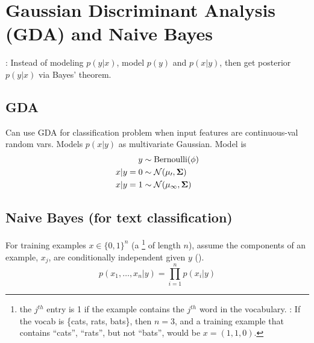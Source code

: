 \documentclass[11pt]{article}
\begin{document}



\section{Gaussian Discriminant Analysis (GDA) and Naive Bayes}
\label{sec:GDA_nbayes}
: Instead of modeling $p(y|x)$, model $p(y)$ and $p(x|y)$,
then get posterior $p(y|x)$ via Bayes' theorem.

\subsection{GDA}
Can use GDA for classification problem when input features are continuous-val random
vars. Models $p(x|y)$ as multivariate Gaussian. Model is
\begin{align}
  y     &\sim \textrm{Bernoulli}(\phi) \nonumber\\
  x|y=0 &\sim \mathcal{N(\mu_0, \boldsymbol{\Sigma})} \nonumber\\
  x|y=1 &\sim \mathcal{N(\mu_1, \boldsymbol{\Sigma})}
\end{align}

\TODOFIN{}

\subsection{Naive Bayes (for text classification)}
For training examples $x \in \{0,1\}^n$ (a \footnote{the $j^{th}$
  entry is 1 if the example contains the $j^{th}$ word in the vocabulary. :
  If the vocab is \{cats, rats, bats\}, then $n=3$, and a training example that contains
  ``cats'', ``rats'', but not ``bats'', would be $x = (1, 1, 0)$.} of length $n$),
assume the components of an example, $x_j$, are conditionally independent given $y$
().
\begin{equation}
  p(x_1, \dots, x_n | y) = \prod_{i=1}^n p(x_i | y)
\end{equation}
\end{document}
